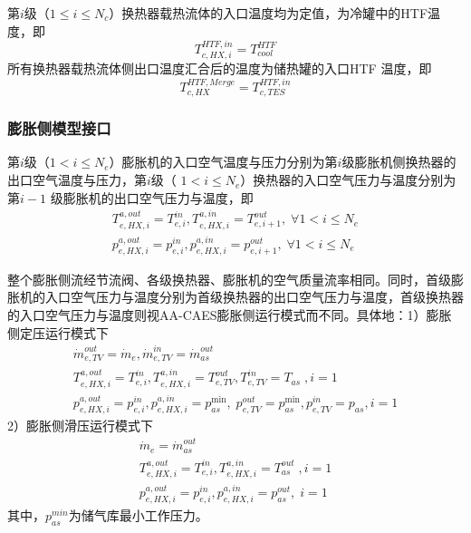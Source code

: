 第$i$级（$1\le i\le {N_c}$）换热器载热流体的入口温度均为定值，为冷罐中的HTF温度，即
\begin{equation}
T_{c,HX,i}^{HTF,in} = T_{cool}^{HTF}
\end{equation}
所有换热器载热流体侧出口温度汇合后的温度为储热罐的入口HTF 温度，即
\begin{equation}
T_{c,HX}^{HTF,Merge} = T_{c,TES}^{HTF,in}
\end{equation}

\subsubsection{膨胀侧模型接口}
第$i$级（$1<i\le N_e$）膨胀机的入口空气温度与压力分别为第$i$级膨胀机侧换热器的出口空气温度与压力，第$i$级（ $1<i\le N_e$）换热器的入口空气压力与温度分别为第$i-1$ 级膨胀机的出口空气压力与温度，即
\begin{subequations}
\begin{gather}
T_{e,HX,i}^{a,out} = T_{e,i}^{in},T_{e,HX,i}^{a,in} = T_{e,i + 1}^{out},\;\forall 1<i\le N_e\\
p_{e,HX,i}^{a,out} = p_{e,i}^{in},p_{e,HX,i}^{a,in} = p_{e,i + 1}^{out},\;\forall 1<i\le N_e
\end{gather}
\end{subequations}

整个膨胀侧流经节流阀、各级换热器、膨胀机的空气质量流率相同。同时，首级膨胀机的入口空气压力与温度分别为首级换热器的出口空气压力与温度，首级换热器的入口空气压力与温度则视AA-CAES膨胀侧运行模式而不同。具体地：1）膨胀侧定压运行模式下
\begin{subequations}
\begin{gather}
\dot m_{e,TV}^{out} = {{\dot m}_e},\dot m_{e,TV}^{in} = \dot m_{as}^{out}\\
T_{e,HX,i}^{a,out} = T_{e,i}^{in},T_{e,HX,i}^{a,in} = T_{e,TV}^{out},T_{e,TV}^{in} = T_{as}\;,i = 1\\
p_{e,HX,i}^{a,out} = p_{e,i}^{in},p_{e,HX,i}^{a,in} = p_{as}^{\min },\;p_{e,TV}^{out} = p_{as}^{\min },p_{e,TV}^{in} = p_{as}^{},i = 1
\end{gather}
\end{subequations}
2）膨胀侧滑压运行模式下
\begin{subequations}
\begin{gather}
{{\dot m}_e} = \dot m_{as}^{out}\\
T_{e,HX,i}^{a,out} = T_{e,i}^{in},T_{e,HX,i}^{a,in} = T_{as}^{out}\;,i = 1\\
p_{e,HX,i}^{a,out} = p_{e,i}^{in},p_{e,HX,i}^{a,in} = p_{as}^{out},\;i = 1
\end{gather}
\end{subequations}
其中，$p_{as}^{min}$为储气库最小工作压力。

